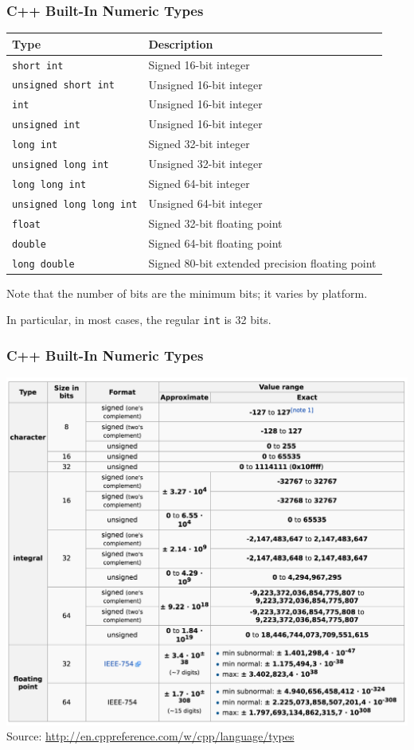 \begin{frame}
\frametitle{C++ Built-In Numeric Types}
\begin{center}
{\scriptsize
\begin{tabular}{l|l}
\textbf{Type} & \textbf{Description}\\ \hline
\texttt{short int} & Signed 16-bit integer\\ \hline
\texttt{unsigned short int} & Unsigned 16-bit integer\\ \hline
\texttt{int} & Unsigned 16-bit integer\\ \hline
\texttt{unsigned int} & Unsigned 16-bit integer\\ \hline
\texttt{long int} & Signed 32-bit integer\\ \hline
\texttt{unsigned long int} & Unsigned 32-bit integer\\ \hline
\texttt{long long int} & Signed 64-bit integer\\ \hline
\texttt{unsigned long long int} & Unsigned 64-bit integer\\ \hline
\texttt{float} & Signed 32-bit floating point\\ \hline
\texttt{double} & Signed 64-bit floating point\\ \hline
\texttt{long double} & Signed 80-bit extended precision floating point\\
\end{tabular}
}
\end{center}

Note that the number of bits are the minimum bits; it varies by platform.

In particular, in most cases, the regular \texttt{int} is 32 bits.

\end{frame}

\begin{frame}
\frametitle{C++ Built-In Numeric Types}

\begin{center}
\includegraphics[width=.78\textwidth]{images/cppvaluerange.png}\\
{\scriptsize Source: \url{http://en.cppreference.com/w/cpp/language/types}}
\end{center}



\end{frame}

